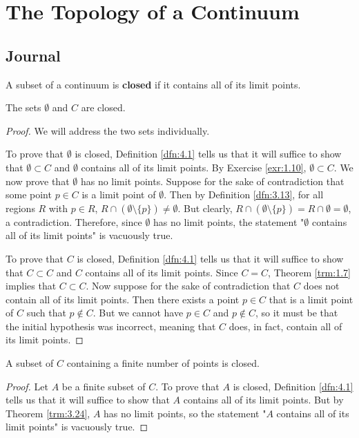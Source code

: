 \documentclass[../main.tex]{subfiles}
\begin{document}
\chapter{The Topology of a Continuum}\label{sct:4}
\section{Journal}
\begin{definition}\label{dfn:4.1}
    A subset of a continuum is \textbf{closed} if it contains all of its limit points.
\end{definition}

\begin{theorem}\label{trm:4.2}
    The sets $\emptyset$ and $C$ are closed.
    \begin{proof}
        We will address the two sets individually.\par
        To prove that $\emptyset$ is closed, Definition \ref{dfn:4.1} tells us that it will suffice to show that $\emptyset\subset C$ and $\emptyset$ contains all of its limit points. By Exercise \ref{exr:1.10}, $\emptyset\subset C$. We now prove that $\emptyset$ has no limit points. Suppose for the sake of contradiction that some point $p\in C$ is a limit point of $\emptyset$. Then by Definition \ref{dfn:3.13}, for all regions $R$ with $p\in R$, $R\cap(\emptyset\setminus\{p\})\neq\emptyset$. But clearly, $R\cap(\emptyset\setminus\{p\})=R\cap\emptyset=\emptyset$, a contradiction. Therefore, since $\emptyset$ has no limit points, the statement "$\emptyset$ contains all of its limit points" is vacuously true.\par
        To prove that $C$ is closed, Definition \ref{dfn:4.1} tells us that it will suffice to show that $C\subset C$ and $C$ contains all of its limit points. Since $C=C$, Theorem \ref{trm:1.7} implies that $C\subset C$. Now suppose for the sake of contradiction that $C$ does not contain all of its limit points. Then there exists a point $p\in C$ that is a limit point of $C$ such that $p\notin C$. But we cannot have $p\in C$ and $p\notin C$, so it must be that the initial hypothesis was incorrect, meaning that $C$ does, in fact, contain all of its limit points.
    \end{proof}
\end{theorem}

\begin{theorem}\label{trm:4.3}
    A subset of $C$ containing a finite number of points is closed.
    \begin{proof}
        Let $A$ be a finite subset of $C$. To prove that $A$ is closed, Definition \ref{dfn:4.1} tells us that it will suffice to show that $A$ contains all of its limit points. But by Theorem \ref{trm:3.24}, $A$ has no limit points, so the statement "$A$ contains all of its limit points" is vacuously true.
    \end{proof}
\end{theorem}
\end{document}
